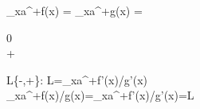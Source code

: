 \begin{multicols}{2}
\begin{minipage}{\linewidth}
\begin{BM}
	\lim_{x\to a^+}f(x)
=	\lim_{x\to a^+}g(x)
=	\begin{cases}
		0
	\\	+\infty
	\end{cases}
\end{BM}

\begin{BM}
	\exists L\in{}\cup\{-\infty,+\infty\}:
	L=\lim_{x\to a^+}f'(x)/g'(x)
\implies \\
\implies
	\lim_{x\to a^+}f(x)/g(x)=\lim_{x\to a^+}f'(x)/g'(x)=L
\end{BM}


\end{minipage}

\end{multicols}




























